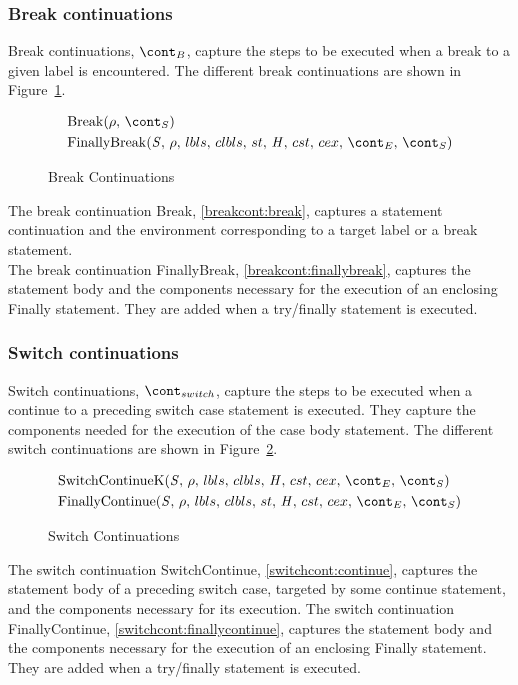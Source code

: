 \documentclass{article}
\begin{document}
\subsubsection{Break continuations}
\label{subsubsec:break-continuations}

Break continuations, $\bcont$, capture the steps to be executed when a break to a given label is encountered.
The different break continuations are shown in Figure~\ref{figure:breakcont}.
\newcommand{\Break}[2]{\mathrm{Break}(#1,\,#2)}
\newcommand{\FinallyBreak}[2]{\mathrm{FinallyBreak}({#1},\,\env,\,\lbls,\,\clbls,\,\strace,\,\handler,\,\cstrace,\,\cex,\,\econt,\,{#2})}

\begin{figure}[Htp]
  \begin{align}
    &\Break{\env}{\scont} \label{breakcont:break} \\
    &\FinallyBreak{\stmt}{\scont} \label{breakcont:finallybreak}
  \end{align}
  \caption{Break Continuations}
  \label{figure:breakcont}
\end{figure}
\noindent
The break continuation Break, \ref{breakcont:break}, captures a statement continuation and the environment corresponding to a target label or a break statement.\\
The break continuation FinallyBreak, \ref{breakcont:finallybreak}, captures the statement body and the components necessary for the execution of an enclosing Finally statement. 
They are added when a try/finally statement is executed.
\subsubsection{Switch continuations}
\label{subsubsec:switch-continuations}

Switch continuations, $\switchcont$, capture the steps to be executed when a continue to a preceding switch case statement is executed.
They capture the components needed for the execution of the case body statement.
The different switch continuations are shown in Figure~\ref{figure:switchconts}.
%
\newcommand{\ContinueK}{\mathrm{SwitchContinueK}(\stmt,\,\env,\,\lbls,\,\clbls,\,\handler,\,\cstrace,\,\cex,\,\econt,\,\scont)}
\newcommand{\FinallyContinue}[2]{\mathrm{FinallyContinue}({#1},\,\env,\,\lbls,\,\clbls,\,\strace,\,\handler,\,\cstrace,\,\cex,\,\econt,\,{#2})}

\begin{figure}[Htp]
  \begin{align}
    &\ContinueK \label{switchcont:continue} \\
    &\FinallyContinue{\stmt}{\scont} \label{switchcont:finallycontinue}
  \end{align}
  \caption{Switch Continuations}
  \label{figure:switchconts}
\end{figure}
\noindent
The switch continuation SwitchContinue, \ref{switchcont:continue}, captures the statement body of a preceding switch case, targeted by some continue statement, and the components necessary for its execution.
The switch continuation FinallyContinue, \ref{switchcont:finallycontinue}, captures the statement body and the components necessary for the execution of an enclosing Finally statement.
They are added when a try/finally statement is executed.
\end{document}
